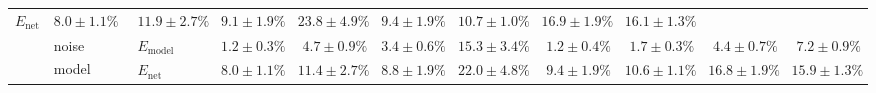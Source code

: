 \begin{sidewaystable}
\begin{tabular}{p{2.2cm} p{1.7cm} l r r r r r r r r }
	$E_\mathrm{net}$ &
	\cellcolor{White!38!SteelBlue}$8.0 \pm 1.1\%$ & \cellcolor{White!32!SteelBlue}$11.9 \pm 2.7\%$ & \cellcolor{White!44!SteelBlue}$9.1 \pm 1.9\%$ & \cellcolor{White!38!SteelBlue}$23.8 \pm 4.9\%$ & \cellcolor{White!25!SteelBlue}$9.4 \pm 1.9\%$ & \cellcolor{White!7!SteelBlue}$10.7 \pm 1.0\%$ & \cellcolor{White!7!SteelBlue}$16.9 \pm 1.9\%$ & \cellcolor{White!7!SteelBlue}$16.1 \pm 1.3\%$
	\\\cmidrule(l){2-11}
	&
	\multirow{2}{1.7cm}{\raggedleft %
	noise model\textsuperscript{\dag}} &
	$E_\mathrm{model}$ & 
	\color{Gray}$1.2 \pm 0.3\%$ & \color{Gray}$4.7 \pm 0.9\%$ & \color{Gray}$3.4 \pm 0.6\%$ & \color{Gray}$15.3 \pm 3.4\%$ & \color{Gray}$1.2 \pm 0.4\%$ & \color{Gray}$1.7 \pm 0.3\%$ & \color{Gray}$4.4 \pm 0.7\%$ & \color{Gray}$7.2 \pm 0.9\%$
	\\
	& & 
	$E_\mathrm{net}$ &
	\cellcolor{White!32!SteelBlue}$8.0 \pm 1.1\%$ & \cellcolor{White!38!SteelBlue}$11.4 \pm 2.7\%$ & \cellcolor{White!50!SteelBlue}$8.8 \pm 1.9\%$ & \cellcolor{White!57!SteelBlue}$22.0 \pm 4.8\%$ & \cellcolor{White!19!SteelBlue}$9.4 \pm 1.9\%$ & \cellcolor{White!13!SteelBlue}$10.6 \pm 1.1\%$ & \cellcolor{White!13!SteelBlue}$16.8 \pm 1.9\%$ & \cellcolor{White!13!SteelBlue}$15.9 \pm 1.3\%$
	\\
	\bottomrule
	\end{tabular}
\end{sidewaystable}

